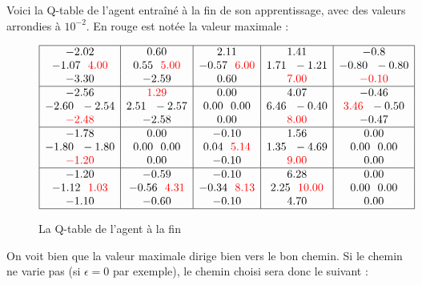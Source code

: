 Voici la Q-table de l'agent entraîné à la fin de son apprentissage, avec des valeurs arrondies à $10^{-2}$. En rouge est notée la valeur maximale : 
\begin{figure}[!ht]
\centering
$$\begin{array}{|c|c|c|c|c|}
\hline
-2.02                           & 0.60                          & 2.11                           & 1.41                           & -0.8 \\
-1.07~ ~ \textcolor{red}{4.00}  & 0.55~ ~ \textcolor{red}{5.00} & -0.57~ ~ \textcolor{red}{6.00} & 1.71~ ~ -1.21                  & -0.80~ ~ -0.80 \\
-3.30                           & -2.59                         & 0.60                           & \textcolor{red}{7.00}          & \textcolor{red}{-0.10} \\
\hline
-2.56                         & \textcolor{red}{1.29}        & 0.00           & 4.07                            & -0.46 \\
-2.60~ ~ -2.54                & 2.51~ ~-2.57                 & 0.00~ ~ 0.00   & 6.46~ ~ -0.40                   & \textcolor{red}{3.46}~ ~ -0.50 \\
\textcolor{red}{-2.48}        & -2.58                        & 0.00           & \textcolor{red}{8.00}          & -0.47 \\
\hline
-1.78                          & 0.00          & -0.10          & 1.56                         & 0.00\\
-1.80~ ~ -1.80                 & 0.00~ ~ 0.00  & 0.04~ ~ \textcolor{red}{5.14}                     & 1.35~ ~ -4.69                & 0.00~ ~ 0.00 \\
\textcolor{red}{-1.20}         & 0.00          & -0.10                            & \textcolor{red}{9.00}        & 0.00 \\
\hline
-1.20                              & -0.59                          & -0.10                           &  6.28                           & 0.00 \\
-1.12~ ~ \textcolor{red}{1.03}     & -0.56~ ~ \textcolor{red}{4.31} & -0.34~ ~ \textcolor{red}{8.13}  &  2.25~ ~ \textcolor{red}{10.00} & 0.00~ ~ 0.00 \\
-1.10                              & -0.60                          & -0.10                           & 4.70                           & 0.00 \\
\hline
\end{array}
$$
\caption{La Q-table de l'agent à la fin}
\end{figure}
\newpage
On voit bien que la valeur maximale dirige bien vers le bon chemin. Si le chemin ne varie pas (si $\epsilon=0$ par exemple), le chemin choisi sera donc le suivant : 

